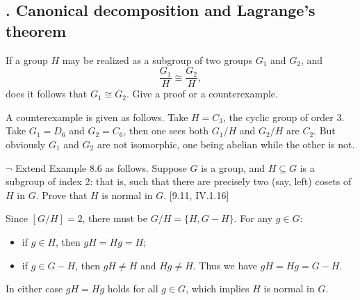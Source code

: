 \documentclass[12pt,letterpaper,boxed]{hmcpset}
\begin{document}
\subsection{. Canonical decomposition and Lagrange's theorem}
\begin{problem}[8.1]
	If a group $H$ may be realized as a subgroup of two groups $G_1$ and $G_2$, and
\[
	\frac{G_1}{H}\cong \frac{G_2}{H},
\]
does it follows that $G_1\cong G_2$. Give a proof or a counterexample.
\end{problem}
\begin{solution}
	A counterexample is given as follows. Take $H=C_3$, the cyclic group of order $3$. Take $G_1=D_6$ and $G_2=C_6$, then one sees both $G_1/H$ and  $G_2/H$ are $C_2$. But obviously $G_1$ and $G_2$ are not isomorphic, one being abelian while the other is not.
\end{solution}

\begin{problem}[8.2]
$\neg$ Extend Example 8.6 as follows. Suppose $G$ is a group, and $H\subseteq G$ is a subgroup of index 2: that is, such that there are precisely two (say, left) cosets of $H$ in $G$. Prove that $H$ is normal in $G$. [9.11, IV.1.16]
\end{problem}
\begin{solution}
Since $[G/H]=2$, there must be $G/H=\{H,G-H\}$. For any $g\in G	$: 
\begin{itemize}
	\item if $g\in H$, then $gH=Hg=H$;
	\item if $g\in G-H$, then $gH\ne H$ and $Hg\ne H$. Thus we have $gH=Hg=G-H$.
\end{itemize}
In either case $gH=Hg$ holds for all $g\in G$, which implies $H$ is normal in $G$.
\end{solution}
\end{document}
